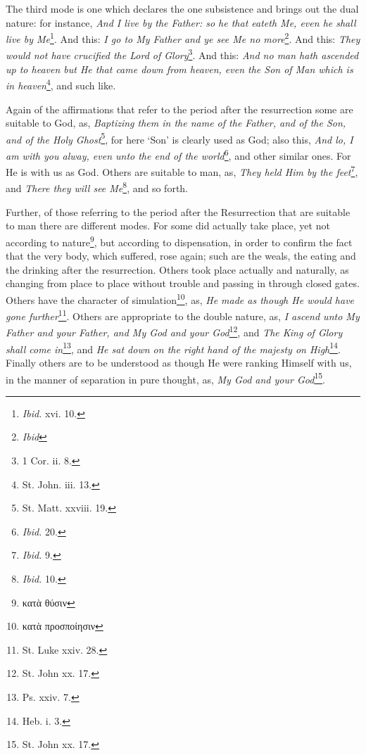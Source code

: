 The third mode is one which declares the one subsistence and brings out the dual nature: for instance, \emph{And I live by the Father: so he that eateth Me, even he shall live by Me}\footnote{\emph{Ibid.} xvi. 10.}. And this: \emph{I go to My Father and ye see Me no more}\footnote{\emph{Ibid}}. And this: \emph{They would not have crucified the Lord of Glory}\footnote{1 Cor. ii. 8.}. And this: \emph{And no man hath ascended up to heaven but He that came down from heaven, even the Son of Man which is in heaven}\footnote{St. John. iii. 13.}, and such like.

Again of the affirmations that refer to the period after the resurrection some are suitable to God, as, \emph{Baptizing them in the name of the Father, and of the Son, and of the Holy Ghost}\footnote{St. Matt. xxviii. 19.}, for here ‘Son’ is clearly used as God; also this, \emph{And lo, I am with you alway, even unto the end of the world}\footnote{\emph{Ibid.} 20.}, and other similar ones. For He is with us as God. Others are suitable to man, as, \emph{They held Him by the feet}\footnote{\emph{Ibid.} 9.}, and \emph{There they will see Me}\footnote{\emph{Ibid.} 10.}, and so forth.

Further, of those referring to the period after the Resurrection that are suitable to man there are different modes. For some did actually take place, yet not according to nature\footnote{\textgreek{κατὰ θύσιν}}, but according to dispensation, in order to confirm the fact that the very body, which suffered, rose again; such are the weals, the eating and the drinking after the resurrection. Others took place actually and naturally, as changing from place to place without trouble and passing in through closed gates. Others have the character of simulation\footnote{\textgreek{κατὰ προσποίησιν}}, as, \emph{He made as though He would have gone further}\footnote{St. Luke xxiv. 28.}. Others are appropriate to the double nature, as, \emph{I ascend unto My Father and your Father, and My God and your God}\footnote{St. John xx. 17.}, and \emph{The King of Glory shall come in}\footnote{Ps. xxiv. 7.}, and \emph{He sat down on the right hand of the majesty on High}\footnote{Heb. i. 3.}. Finally others are to be understood as though He were ranking Himself with us, in the manner of separation in pure thought, as, \emph{My God and your God}\footnote{St. John xx. 17.}.

